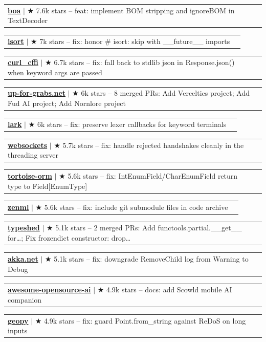 \documentclass[letterpaper,11pt]{article}
\makeatletter
\newcommand{\resumeProjectHeading}[2]{
    \item
    \begin{tabular*}{0.97\textwidth}{l@{\extracolsep{\fill}}r}
      \small#1 & \hspace{8pt}\small#2 \\
    \end{tabular*}\vspace{-11.4pt}
}
\makeatother
\begin{document}
      \resumeProjectHeading{\textbf{\href{https://github.com/boa-dev/boa/pull/4631}{boa}} $|$ {\small $\bigstar$ 7.6k stars} \textnormal{ -- feat: implement BOM stripping and ignoreBOM in TextDecoder}}{}
      \resumeProjectHeading{\textbf{\href{https://github.com/PyCQA/isort/pull/2574}{isort}} $|$ {\small $\bigstar$ 7k stars} \textnormal{ -- fix: honor \# isort: skip with \_\_future\_\_ imports}}{}
      \resumeProjectHeading{\textbf{\href{https://github.com/lexiforest/curl\_cffi/pull/796}{curl\_cffi}} $|$ {\small $\bigstar$ 6.7k stars} \textnormal{ -- fix: fall back to stdlib json in Response.json() when keyword args are passed}}{}
      \resumeProjectHeading{\textbf{\href{https://github.com/up-for-grabs/up-for-grabs.net/pulls?q=is\%3Apr\%20is\%3Amerged\%20author\%3Aapoorvdarshan}{up-for-grabs.net}} $|$ {\small $\bigstar$ 6k stars} \textnormal{ -- 8 merged PRs: Add Verceltics project; Add Fud AI project; Add Nornlore project}}{}
      \resumeProjectHeading{\textbf{\href{https://github.com/lark-parser/lark/pull/1619}{lark}} $|$ {\small $\bigstar$ 6k stars} \textnormal{ -- fix: preserve lexer callbacks for keyword terminals}}{}
      \resumeProjectHeading{\textbf{\href{https://github.com/python-websockets/websockets/pull/1726}{websockets}} $|$ {\small $\bigstar$ 5.7k stars} \textnormal{ -- fix: handle rejected handshakes cleanly in the threading server}}{}
      \resumeProjectHeading{\textbf{\href{https://github.com/tortoise/tortoise-orm/pull/2243}{tortoise-orm}} $|$ {\small $\bigstar$ 5.6k stars} \textnormal{ -- fix: IntEnumField/CharEnumField return type to Field[EnumType]}}{}
      \resumeProjectHeading{\textbf{\href{https://github.com/zenml-io/zenml/pull/4496}{zenml}} $|$ {\small $\bigstar$ 5.6k stars} \textnormal{ -- fix: include git submodule files in code archive}}{}
      \resumeProjectHeading{\textbf{\href{https://github.com/python/typeshed/pulls?q=is\%3Apr\%20is\%3Amerged\%20author\%3Aapoorvdarshan}{typeshed}} $|$ {\small $\bigstar$ 5.1k stars} \textnormal{ -- 2 merged PRs: Add functools.partial.\_\_get\_\_ for…; Fix frozendict constructor: drop…}}{}
      \resumeProjectHeading{\textbf{\href{https://github.com/akkadotnet/akka.net/pull/8048}{akka.net}} $|$ {\small $\bigstar$ 5.1k stars} \textnormal{ -- fix: downgrade RemoveChild log from Warning to Debug}}{}
      \resumeProjectHeading{\textbf{\href{https://github.com/alvinreal/awesome-opensource-ai/pull/664}{awesome-opensource-ai}} $|$ {\small $\bigstar$ 4.9k stars} \textnormal{ -- docs: add Scowld mobile AI companion}}{}
      \resumeProjectHeading{\textbf{\href{https://github.com/geopy/geopy/pull/610}{geopy}} $|$ {\small $\bigstar$ 4.9k stars} \textnormal{ -- fix: guard Point.from\_string against ReDoS on long inputs}}{}
\end{document}
